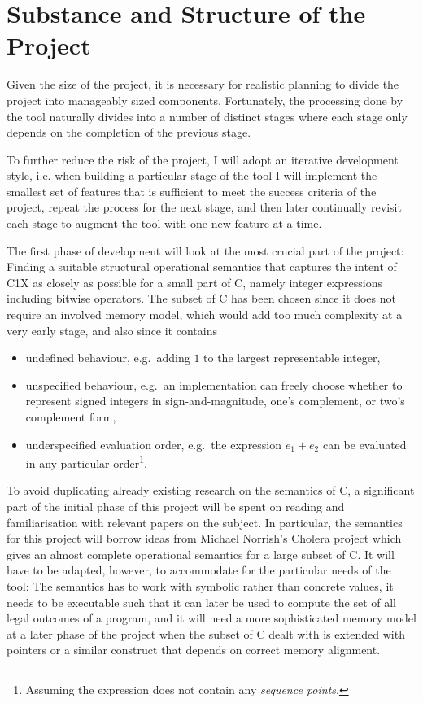 \documentclass[12pt,a4paper,titlepage]{article}
\begin{document}
\section*{Substance and Structure of the Project}
Given the size of the project, it is necessary for realistic planning to divide the project into manageably sized components. Fortunately, the processing done by the tool naturally divides into a number of distinct stages where each stage only depends on the completion of the previous stage.

To further reduce the risk of the project, I will adopt an iterative development style, i.e. when building a particular stage of the tool I will implement the smallest set of features that is sufficient to meet the success criteria of the project, repeat the process for the next stage, and then later continually revisit each stage to augment the tool with one new feature at a time.

The first phase of development will look at the most crucial part of the project: Finding a suitable structural operational semantics that captures the intent of C1X as closely as possible for a small part of C, namely integer expressions including bitwise operators. The subset of C has been chosen since it does not require an involved memory model, which would add too much complexity at a very early stage, and also since it contains
\begin{itemize}
 \item undefined behaviour, e.g.~adding $1$ to the largest representable integer,
 \item unspecified behaviour, e.g.~an implementation can freely choose whether to represent signed integers in sign-and-magnitude, one's complement, or two's complement form,
 \item underspecified evaluation order, e.g.~the expression $e_1 + e_2$ can be evaluated in any particular order\footnote{Assuming the expression does not contain any \textit{sequence points}.}.
\end{itemize}
To avoid duplicating already existing research on the semantics of C, a significant part of the initial phase of this project will be spent on reading and familiarisation with relevant papers on the subject. In particular, the semantics for this project will borrow ideas from Michael Norrish's Cholera project \cite{norrishPhd} which gives an almost complete operational semantics for a large subset of C. It will have to be adapted, however, to accommodate for the particular needs of the tool: The semantics has to work with symbolic rather than concrete values, it needs to be executable such that it can later be used to compute the set of all legal outcomes of a program, and it will need a more sophisticated memory model at a later phase of the project when the subset of C dealt with is extended with pointers or a similar construct that depends on correct memory alignment.
\end{document}
